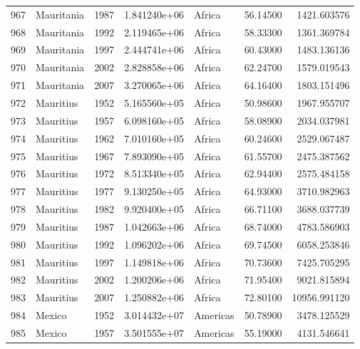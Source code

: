 \documentclass[
  letterpaper,
  DIV=11,
  numbers=noendperiod]{scrreprt}
\begin{document}
\begin{tabular}{llrrlrr}
967  &                Mauritania &  1987 &  1.841240e+06 &    Africa &  56.14500 &    1421.603576 \\
968  &                Mauritania &  1992 &  2.119465e+06 &    Africa &  58.33300 &    1361.369784 \\
969  &                Mauritania &  1997 &  2.444741e+06 &    Africa &  60.43000 &    1483.136136 \\
970  &                Mauritania &  2002 &  2.828858e+06 &    Africa &  62.24700 &    1579.019543 \\
971  &                Mauritania &  2007 &  3.270065e+06 &    Africa &  64.16400 &    1803.151496 \\
972  &                 Mauritius &  1952 &  5.165560e+05 &    Africa &  50.98600 &    1967.955707 \\
973  &                 Mauritius &  1957 &  6.098160e+05 &    Africa &  58.08900 &    2034.037981 \\
974  &                 Mauritius &  1962 &  7.010160e+05 &    Africa &  60.24600 &    2529.067487 \\
975  &                 Mauritius &  1967 &  7.893090e+05 &    Africa &  61.55700 &    2475.387562 \\
976  &                 Mauritius &  1972 &  8.513340e+05 &    Africa &  62.94400 &    2575.484158 \\
977  &                 Mauritius &  1977 &  9.130250e+05 &    Africa &  64.93000 &    3710.982963 \\
978  &                 Mauritius &  1982 &  9.920400e+05 &    Africa &  66.71100 &    3688.037739 \\
979  &                 Mauritius &  1987 &  1.042663e+06 &    Africa &  68.74000 &    4783.586903 \\
980  &                 Mauritius &  1992 &  1.096202e+06 &    Africa &  69.74500 &    6058.253846 \\
981  &                 Mauritius &  1997 &  1.149818e+06 &    Africa &  70.73600 &    7425.705295 \\
982  &                 Mauritius &  2002 &  1.200206e+06 &    Africa &  71.95400 &    9021.815894 \\
983  &                 Mauritius &  2007 &  1.250882e+06 &    Africa &  72.80100 &   10956.991120 \\
984  &                    Mexico &  1952 &  3.014432e+07 &  Americas &  50.78900 &    3478.125529 \\
985  &                    Mexico &  1957 &  3.501555e+07 &  Americas &  55.19000 &    4131.546641 \\

\end{tabular}
\end{document}
